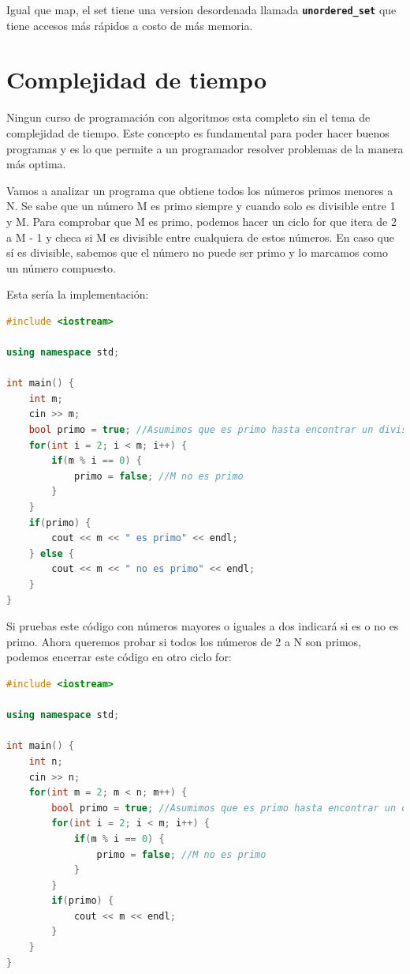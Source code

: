 \documentclass{article}
\begin{document}
Igual que map, el set tiene una version desordenada llamada \textbf{\lstinline{unordered_set}} que tiene accesos más rápidos a costo de más memoria.

\section{Complejidad de tiempo}

Ningun curso de programación con algoritmos esta completo sin el tema de complejidad de tiempo. Este concepto es fundamental para poder hacer buenos programas y es lo que permite a un programador resolver problemas de la manera más optima.

Vamos a analizar un programa que obtiene todos los números primos menores a N. Se sabe que un número M es primo siempre y cuando solo es divisible entre 1 y M. Para comprobar que M es primo, podemos hacer un ciclo for que itera de 2 a M - 1 y checa si M es divisible entre cualquiera de estos números. En caso que sí es divisible, sabemos que el número no puede ser primo y lo marcamos como un número compuesto.

Esta sería la implementación:

\begin{lstlisting}[language=C++, title=Probando si M es primo]
#include <iostream>

using namespace std;

int main() {
	int m;
	cin >> m;
	bool primo = true; //Asumimos que es primo hasta encontrar un divisor
	for(int i = 2; i < m; i++) {
		if(m % i == 0) {
			primo = false; //M no es primo
		}
	}
	if(primo) {
		cout << m << " es primo" << endl;
	} else {
		cout << m << " no es primo" << endl;
	}
}
\end{lstlisting}

Si pruebas este código con números mayores o iguales a dos indicará si es o no es primo. Ahora queremos probar si todos los números de 2 a N son primos, podemos encerrar este código en otro ciclo for:

\begin{lstlisting}[language=C++, title=Encontrando primos menores que N]
#include <iostream>

using namespace std;

int main() {
	int n;
	cin >> n;
	for(int m = 2; m < n; m++) {
		bool primo = true; //Asumimos que es primo hasta encontrar un divisor
		for(int i = 2; i < m; i++) {
			if(m % i == 0) {
				primo = false; //M no es primo
			}
		}
		if(primo) {
			cout << m << endl;
		}
	}
}
\end{lstlisting}
\end{document}
